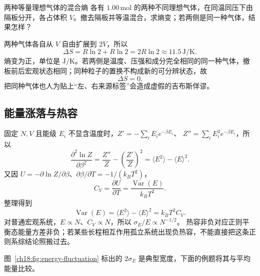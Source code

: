 \begin{origexamplebox}{两种等量理想气体的混合熵}
各有 $1.00\,\mathrm{mol}$ 的两种不同理想气体，在同温同压下由隔板分开，各占体积 $V$。撤去隔板并等温混合，求熵变；若两侧是同一种气体，结果怎样？
\end{origexamplebox}
\begin{xesolution}
两种气体各自从 $V$ 自由扩展到 $2V$，所以
\[
 \Delta S=R\ln2+R\ln2=\boxed{2R\ln2\approx11.5\,\mathrm{J/K}}.
\]
熵变为正，单位是 $\mathrm{J/K}$。若两侧是温度、压强和成分完全相同的同一种气体，撤板前后宏观状态相同；同种粒子的置换不构成新的可分辨状态，故
\[
 \boxed{\Delta S=0}.
\]
把同种气体也人为贴上“左、右来源标签”会造成虚假的吉布斯佯谬。
\end{xesolution}

\subsection{能量涨落与热容}

固定 $N,V$ 且能级 $E_i$ 不显含温度时，$Z'= -\sum_iE_ie^{-\beta E_i}$、
$Z''=\sum_iE_i^2e^{-\beta E_i}$，所以
\[\frac{\partial^2\ln Z}{\partial\beta^2}
=\frac{Z''}Z-\left(\frac{Z'}Z\right)^2=\langle E^2\rangle-\langle E\rangle^2.\]
又因 $U=-\partial\ln Z/\partial\beta$、$\partial\beta/\partial T=-1/(k_BT^2)$，
\[ C_V=\frac{\partial U}{\partial T}
=\frac{\operatorname{Var}(E)}{k_BT^2}.\]
整理得到
\begin{equation}
 \operatorname{Var}(E)=\langle E^2\rangle-\langle E\rangle^2
 =k_BT^2C_V.
\end{equation}
对普通宏观系统，$E\propto N$、$C_V\propto N$，所以 $\sigma_E/E\propto N^{-1/2}$。
热容非负对应正则平衡态能量方差非负；若某些长程相互作用孤立系统出现负热容，不能直接把这条正则系综结论照搬过去。

\begin{center}
\label{ch18:fig:energy-fluctuation}
\end{center}
图~\ref{ch18:fig:energy-fluctuation} 标出的 $2\sigma_E$ 是典型宽度，下面的例题将其与平均能量比较。


